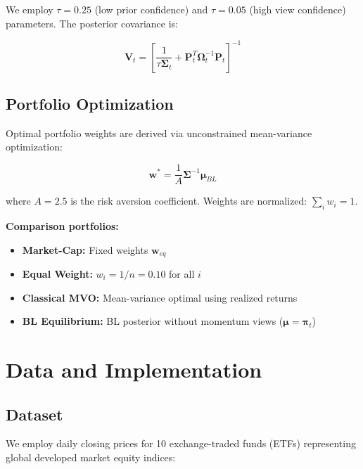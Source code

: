 \documentclass[12pt,a4paper]{article}
\begin{document}
We employ $\tau = 0.25$ (low prior confidence) and $\tau = 0.05$ (high view confidence) parameters. The posterior covariance is:

\begin{equation}
\mathbf{V}_t = \left[\frac{1}{\tau \boldsymbol{\Sigma}_t} + \mathbf{P}_t^T \boldsymbol{\Omega}_t^{-1} \mathbf{P}_t\right]^{-1}
\end{equation}

\subsection{Portfolio Optimization}

Optimal portfolio weights are derived via unconstrained mean-variance optimization:

\begin{equation}
\mathbf{w}^* = \frac{1}{A} \boldsymbol{\Sigma}^{-1} \boldsymbol{\mu}_{BL}
\end{equation}

where $A = 2.5$ is the risk aversion coefficient. Weights are normalized: $\sum_i w_i = 1$.

\textbf{Comparison portfolios:}
\begin{itemize}
\item \textbf{Market-Cap:} Fixed weights $\mathbf{w}_{eq}$ 
\item \textbf{Equal Weight:} $w_i = 1/n = 0.10$ for all $i$
\item \textbf{Classical MVO:} Mean-variance optimal using realized returns
\item \textbf{BL Equilibrium:} BL posterior without momentum views ($\boldsymbol{\mu} = \boldsymbol{\pi}_t$)
\end{itemize}

\section{Data and Implementation}

\subsection{Dataset}

We employ daily closing prices for 10 exchange-traded funds (ETFs) representing global developed market equity indices:
\end{document}
